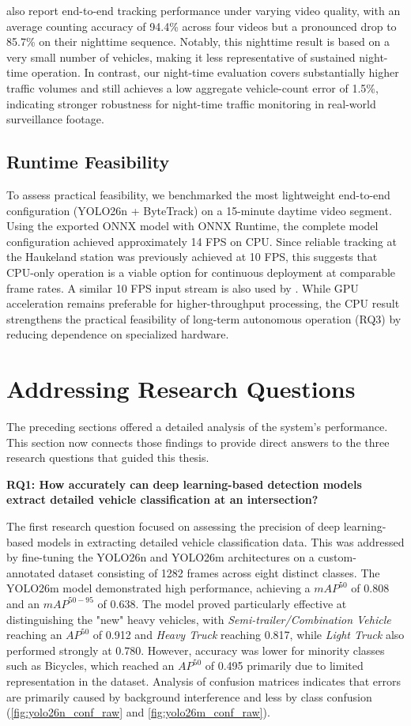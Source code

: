 \citet{Neupane2022RealTimeVehicle} also report end-to-end tracking performance under varying video quality, with an average counting accuracy of 94.4\% across four videos but a pronounced drop to 85.7\% on their nighttime sequence. Notably, this nighttime result is based on a very small number of vehicles, making it less representative of sustained night-time operation. In contrast, our night-time evaluation covers substantially higher traffic volumes and still achieves a low aggregate vehicle-count error of 1.5\%, indicating stronger robustness for night-time traffic monitoring in real-world surveillance footage.

\subsection{Runtime Feasibility}
To assess practical feasibility, we benchmarked the most lightweight end-to-end configuration (YOLO26n + ByteTrack) on a 15-minute daytime video segment. Using the exported ONNX model with ONNX Runtime, the complete model configuration achieved approximately 14 FPS on CPU. Since reliable tracking at the Haukeland station was previously achieved at 10 FPS, this suggests that CPU-only operation is a viable option for continuous deployment at comparable frame rates. A similar 10 FPS input stream is also used by \cite{Neupane2022RealTimeVehicle}. While GPU acceleration remains preferable for higher-throughput processing, the CPU result strengthens the practical feasibility of long-term autonomous operation (RQ3) by reducing dependence on specialized hardware.


\section{Addressing Research Questions}
The preceding sections offered a detailed analysis of the system's performance. This section now connects those findings to provide direct answers to the three research questions that guided this thesis.

\textbf{RQ1:  How accurately can deep learning-based detection models extract detailed vehicle classification at an intersection?}

The first research question focused on assessing the precision of deep learning-based models in extracting detailed vehicle classification data. This was addressed by fine-tuning the YOLO26n and YOLO26m architectures on a custom-annotated dataset consisting of 1282 frames across eight distinct classes. The YOLO26m model demonstrated high performance, achieving a $mAP^{50}$ of 0.808 and an $mAP^{50-95}$ of 0.638. The model proved particularly effective at distinguishing the "new" heavy vehicles, with \textit{Semi-trailer/Combination Vehicle} reaching an $AP^{50}$ of 0.912 and \textit{Heavy Truck} reaching 0.817, while \textit{Light Truck} also performed strongly at 0.780. However, accuracy was lower for minority classes such as Bicycles, which reached an $AP^{50}$ of 0.495 primarily due to limited representation in the dataset. Analysis of confusion matrices indicates that errors are primarily caused by background interference and less by class confusion (\autoref{fig:yolo26n_conf_raw} and \ref{fig:yolo26m_conf_raw}).

